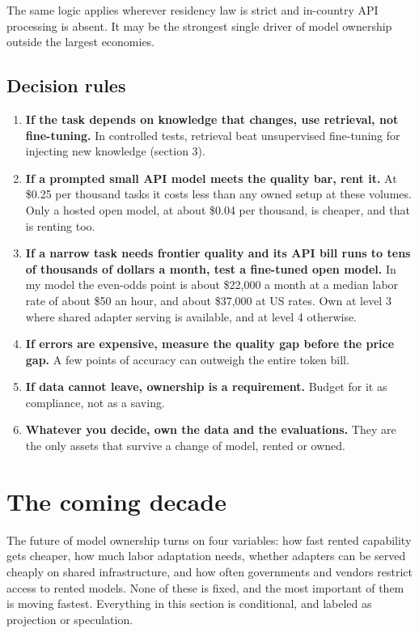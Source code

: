  The same logic applies wherever residency law is strict and in-country API processing is absent. It may be the strongest single driver of model ownership outside the largest economies.

\subsection{Decision rules}

\begin{enumerate}
\def\labelenumi{\arabic{enumi}.}
\tightlist
\item
  \textbf{If the task depends on knowledge that changes, use retrieval, not fine-tuning.} In controlled tests, retrieval beat unsupervised fine-tuning for injecting new knowledge (section 3).
\item
  \textbf{If a prompted small API model meets the quality bar, rent it.} At \$0.25 per thousand tasks it costs less than any owned setup at these volumes. Only a hosted open model, at about \$0.04 per thousand, is cheaper, and that is renting too.
\item
  \textbf{If a narrow task needs frontier quality and its API bill runs to tens of thousands of dollars a month, test a fine-tuned open model.} In my model the even-odds point is about \$22,000 a month at a median labor rate of about \$50 an hour, and about \$37,000 at US rates. Own at level 3 where shared adapter serving is available, and at level 4 otherwise.
\item
  \textbf{If errors are expensive, measure the quality gap before the price gap.} A few points of accuracy can outweigh the entire token bill.
\item
  \textbf{If data cannot leave, ownership is a requirement.} Budget for it as compliance, not as a saving.
\item
  \textbf{Whatever you decide, own the data and the evaluations.} They are the only assets that survive a change of model, rented or owned.
\end{enumerate}

\section{The coming decade}

The future of model ownership turns on four variables: how fast rented capability gets cheaper, how much labor adaptation needs, whether adapters can be served cheaply on shared infrastructure, and how often governments and vendors restrict access to rented models. None of these is fixed, and the most important of them is moving fastest. Everything in this section is conditional, and labeled as projection or speculation.

